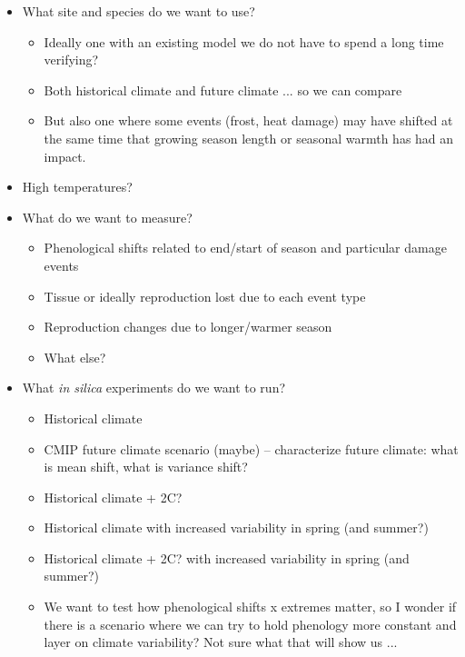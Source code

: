 \documentclass[11pt,letter]{article}
\begin{document}
\begin{itemize}
\item What site and species do we want to use?
\begin{itemize}
\item Ideally one with an existing model we do not have to spend a long time verifying? 
\item Both historical climate and future climate ... so we can compare
\item But also one where some events (frost, heat damage) may have shifted at the same time that growing season length or seasonal warmth has had an impact.
\end{itemize}
\item High temperatures?
\item What do we want to measure?
\begin{itemize}
\item Phenological shifts related to end/start of season and particular damage events
\item Tissue or ideally reproduction lost due to each event type
\item Reproduction changes due to longer/warmer season
\item What else?
\end{itemize}
\item What \emph{in silica} experiments do we want to run? 
\begin{itemize}
\item Historical climate
\item CMIP future climate scenario (maybe) -- characterize future climate: what is mean shift, what is variance shift? 
\item Historical climate + 2C?
\item Historical climate with increased variability in spring (and summer?)
\item Historical climate + 2C? with increased variability in spring (and summer?)
\item We want to test how phenological shifts x extremes matter, so I wonder if there is a scenario where we can try to hold phenology more constant and layer on climate variability? Not sure what that will show us ... 
\end{itemize}
\end{itemize}
\end{document}
